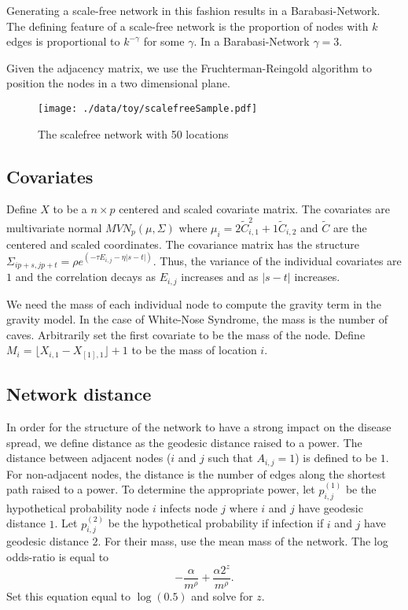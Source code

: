 \documentclass[11pt]{article}
\begin{document}
Generating a scale-free network in this fashion results in a
Barabasi-Network.  The defining feature of a scale-free network is the
proportion of nodes with $k$ edges is proportional to $k^{-\gamma}$
for some $\gamma$.  In a Barabasi-Network $\gamma = 3$.

Given the adjacency matrix, we use the Fruchterman-Reingold algorithm
to position the nodes in a two dimensional plane.


\begin{figure}[htb]
\centering
\texttt{[image: ./data/toy/scalefreeSample.pdf]}
\caption{\label{fig:scalefree50}The scalefree network with 50 locations}
\end{figure}




\subsection{Covariates}
\label{sec-3-2}

Define $X$ to be a $n \times p$ centered and scaled covariate matrix.
The covariates are multivariate normal $MVN_p(\mu,\Sigma)$ where
$\mu_i = 2\widetilde{C}_{i,1}^2 + 1\widetilde{C}_{i,2}$ and
$\widetilde{C}$ are the centered and scaled coordinates.  The
covariance matrix has the structure $\Sigma_{ip + s, jp + t} =
   \rho e^{(-\tau  E_{i,j} - \eta |s-t|)}$.  Thus, the variance of the
individual covariates are $1$ and the correlation decays as $E_{i,j}$
increases and as $|s-t|$ increases.

We need the mass of each individual node to compute the gravity term
in the gravity model.  In the case of White-Nose Syndrome, the mass is
the number of caves.  Arbitrarily set the first covariate to be the
mass of the node.  Define $M_i = \lfloor X_{i,1} - X_{[1],1} \rfloor +
   1$ to be the mass of location $i$.


\subsection{Network distance}
\label{sec-3-3}

In order for the structure of the network to have a strong impact on
the disease spread, we define distance as the geodesic distance raised
to a power.  The distance between adjacent nodes ($i$ and $j$ such
that $A_{i,j} = 1$) is defined to be $1$.  For non-adjacent nodes, the
distance is the number of edges along the shortest path raised to a
power.  To determine the appropriate power, let $p^{(1)}_{i,j}$ be the
hypothetical probability node $i$ infects node $j$ where $i$ and $j$
have geodesic distance $1$.  Let $p^{(2)}_{i,j}$ be the hypothetical
probability if infection if $i$ and $j$ have geodesic distance $2$.
For their mass, use the mean mass of the network.  The log odds-ratio
is equal to
\begin{equation*}
- \frac{\alpha}{m^\rho} + \frac{\alpha2^z}{m^\rho}.
\end{equation*}
Set this equation equal to $\log(0.5)$ and solve for $z$.
\end{document}
